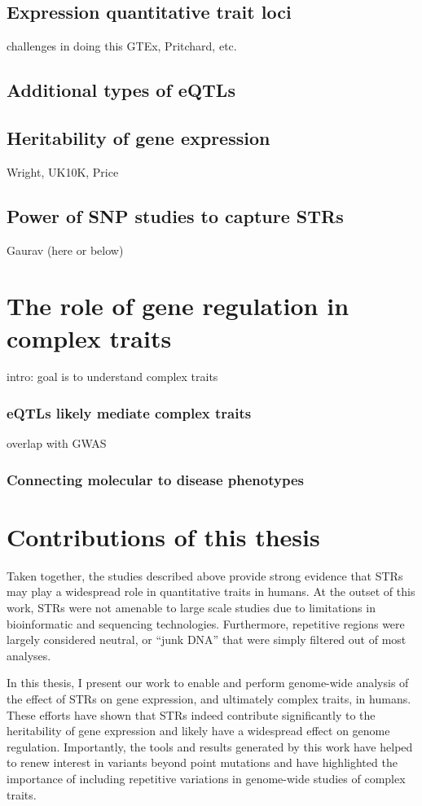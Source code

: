 \subsection{Expression quantitative trait loci}
challenges in doing this
GTEx, Pritchard, etc.
\subsection{Additional types of eQTLs}
\subsection{Heritability of gene expression}
Wright, UK10K, Price
\subsection{Power of SNP studies to capture STRs}
Gaurav (here or below)

\section{The role of gene regulation in complex traits}
intro: goal is to understand complex traits
\subsubsection{eQTLs likely mediate complex traits}
overlap with GWAS
\subsubsection{Connecting molecular to disease phenotypes}

\section{Contributions of this thesis}
Taken together, the studies described above provide strong evidence that STRs may play a widespread role in quantitative traits in humans. At the outset of this work, STRs were not amenable to large scale studies due to limitations in bioinformatic and sequencing technologies. Furthermore, repetitive regions were largely considered neutral, or ``junk DNA'' that were simply filtered out of most analyses.

In this thesis, I present our work to enable and perform genome-wide analysis of the effect of STRs on gene expression, and ultimately complex traits, in humans. These efforts have shown that STRs indeed contribute significantly to the heritability of gene expression and likely have a widespread effect on genome regulation. Importantly, the tools and results generated by this work have helped to renew interest in variants beyond point mutations and have highlighted the importance of including repetitive variations in genome-wide studies of complex traits. 

